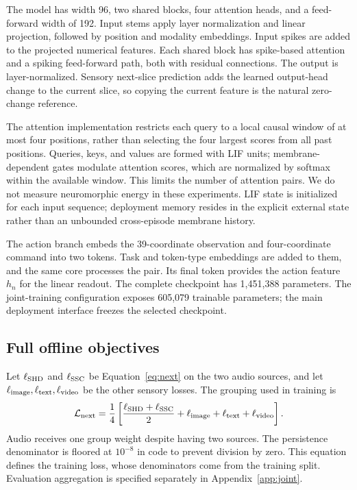 The model has width 96, two shared blocks, four attention heads, and a
feed-forward width of 192. Input stems apply layer normalization and linear
projection, followed by position and modality embeddings. Input spikes are
added to the projected numerical features. Each shared block has spike-based
attention and a spiking feed-forward path, both with residual connections.
The output is layer-normalized. Sensory next-slice prediction adds the learned
output-head change to the current slice, so copying the current feature is
the natural zero-change reference.

The attention implementation restricts each query to a local causal window
of at most four positions, rather than selecting the four largest scores
from all past positions. Queries, keys, and values are formed with LIF units;
membrane-dependent gates modulate attention scores, which are normalized by
softmax within the available window. This limits the number of attention pairs. We do not measure neuromorphic
energy in these experiments. LIF state is initialized
for each input sequence; deployment memory resides in the explicit external
state rather than an unbounded cross-episode membrane history.

The action branch embeds the 39-coordinate observation and four-coordinate
command into two tokens. Task and token-type embeddings are added to them,
and the same core processes the pair. Its final token provides the action
feature $h_n$ for the linear readout. The complete checkpoint has 1,451,388
parameters. The joint-training configuration exposes 605,079 trainable
parameters; the main deployment interface freezes the selected checkpoint.

\subsection{Full offline objectives}
\label{app:losses}
Let $\ell_{\rm SHD}$ and $\ell_{\rm SSC}$ be Equation~\eqref{eq:next} on the
two audio sources, and let $\ell_{\rm image},\ell_{\rm text},\ell_{\rm video}$
be the other sensory losses. The grouping used in training is
\begin{equation}
 \mathcal L_{\mathrm{next}}=\frac14\left[
 \frac{\ell_{\rm SHD}+\ell_{\rm SSC}}2+
 \ell_{\rm image}+\ell_{\rm text}+\ell_{\rm video}\right].
\end{equation}
Audio receives one group weight despite having two sources. The persistence
denominator is floored at $10^{-8}$ in code to prevent division by zero.
This equation defines the training loss, whose denominators come from the
training split. Evaluation aggregation is specified separately in
Appendix~\ref{app:joint}.

